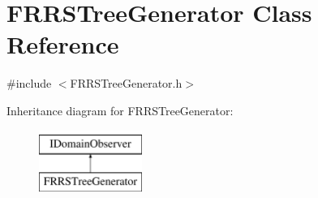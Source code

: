 \hypertarget{class_f_r_r_s_tree_generator}{}\section{F\+R\+R\+S\+Tree\+Generator Class Reference}
\label{class_f_r_r_s_tree_generator}


{\ttfamily \#include $<$F\+R\+R\+S\+Tree\+Generator.\+h$>$}

Inheritance diagram for F\+R\+R\+S\+Tree\+Generator\+:\begin{figure}[H]
\begin{center}
\leavevmode
\includegraphics[height=2.000000cm]{d6/d46/class_f_r_r_s_tree_generator}
\end{center}
\end{figure}
